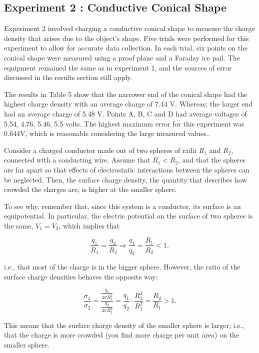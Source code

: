 \newpage

\subsection{Experiment 2 : Conductive Conical Shape}

Experiment 2 involved charging a conductive conical shape to measure the charge density that arises due to the object's shape. Five trials were performed for this experiment to allow for accurate data collection. In each trial, six points on the conical shape were measured using a proof plane and a Faraday ice pail. The equipment remained the same as in experiment  1, and the sources of error discussed in the results section still apply.

The results in Table 5  show that the narrower end of the conical shape had the highest charge density with an average charge of 7.44 V. Whereas; the larger end had an average charge of 5.48 V. Points A, B, C and D had average voltages of 5.54, 4.76, 5.46, 5.5 volts. The highest maximum error for this experiment was 0.644V, which is reasonable considering the large measured values..

Consider a charged conductor made out of two spheres of radii \( R_1 \) and \( R_2 \), connected
with a conducting wire. Assume that \( R_1 < R_2 \), and that the spheres are far apart so that
effects of electrostatic interactions between the spheres can be neglected. Then, the
surface charge density, the quantity that describes how crowded the charges are, is higher
at the smaller sphere.

To see why, remember that, since this system is a conductor, its surface is an
equipotential. In particular, the electric potential on the surface of two spheres is the
same, \( V_1 = V_2 \), which implies that

\[ \frac{q_1}{R_1} = \frac{q_2}{R_2} \Rightarrow \frac{q_1}{q_2} = \frac{R_1}{R_2} < 1, \]

i.e., that most of the charge is in the bigger sphere. However, the ratio of the surface
charge densities behaves the opposite way:

\[ \frac{\sigma_1}{\sigma_2} = \frac{\frac{q_1}{4\pi R_1^2}}{\frac{q_2}{4\pi R_2^2}} = \frac{q_1}{q_2} \cdot \frac{R_2^2}{R_1^2} = \frac{R_2}{R_1} > 1. \]

This means that the surface charge density of the smaller sphere is larger, i.e., that the
charge is more crowded (you find more charge per unit area) on the smaller sphere.

